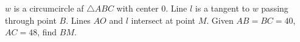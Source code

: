 $w$ is a circumcircle af $\triangle ABC$ with center $0$. Line $l$ is a tangent to $w$ passing through point $B$. Lines $AO$ and $l$ intersect at point $M$. Given $AB=BC=40$, $AC=48$, find $BM$. 